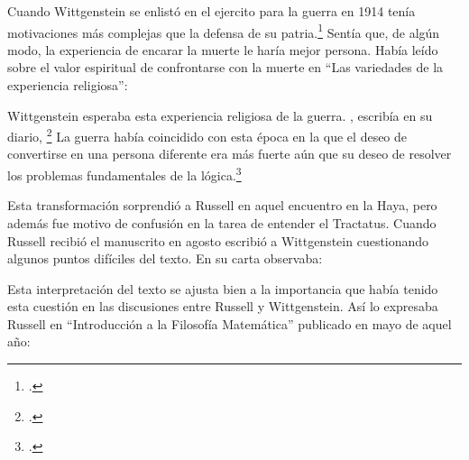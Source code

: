 Cuando Wittgenstein se enlistó en el ejercito para la guerra en 1914 tenía
motivaciones más complejas que la defensa de su patria.\footcite[loc2276]{monk}
Sentía que, de algún modo, la experiencia de encarar la muerte le haría mejor
persona. Había leído sobre el valor espiritual de confrontarse con la muerte en
``Las variedades de la experiencia religiosa'':

Wittgenstein esperaba esta experiencia religiosa de la guerra.
, escribía en su diario, \footcite[loc2295]{monk}
La guerra había coincidido con esta época en la que el deseo de convertirse en
una persona diferente era más fuerte aún que su deseo de resolver los problemas
fundamentales de la lógica.\footcite[loc2305]{monk}

Esta transformación sorprendió a Russell en aquel encuentro en la Haya, pero
además fue motivo de confusión en la tarea de entender el Tractatus. Cuando
Russell recibió el manuscrito en agosto escribió a Wittgenstein cuestionando
algunos puntos difíciles del texto. En su carta observaba: 

Esta interpretación del texto se ajusta bien a la importancia que había tenido
esta cuestión en las discusiones entre Russell y Wittgenstein. Así lo expresaba
Russell en ``Introducción a la Filosofía Matemática'' publicado en mayo de aquel
año: 


